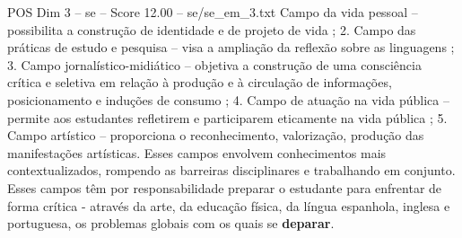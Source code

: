 \begin{textsample}{POS Dim 3 – se – Score 12.00 – se/se\_em\_3.txt}
Campo da vida pessoal – possibilita a construção de identidade e de projeto de vida ; 2.
Campo das práticas de estudo e pesquisa – visa a ampliação da reflexão sobre as linguagens ; 3.
Campo jornalístico-midiático – objetiva a construção de uma consciência crítica e seletiva em relação à produção e à circulação de informações, posicionamento e induções de consumo ; 4.
Campo de atuação na vida pública – permite aos estudantes refletirem e participarem eticamente na vida pública ; 5.
Campo artístico – proporciona o reconhecimento, valorização, produção das manifestações artísticas.
Esses campos envolvem conhecimentos mais contextualizados, rompendo as barreiras disciplinares e trabalhando em conjunto.
Esses campos têm por responsabilidade preparar o estudante para enfrentar de forma crítica - através da arte, da educação física, da língua espanhola, inglesa e portuguesa, os problemas globais com os quais se \textbf{deparar}.

\end{textsample}
